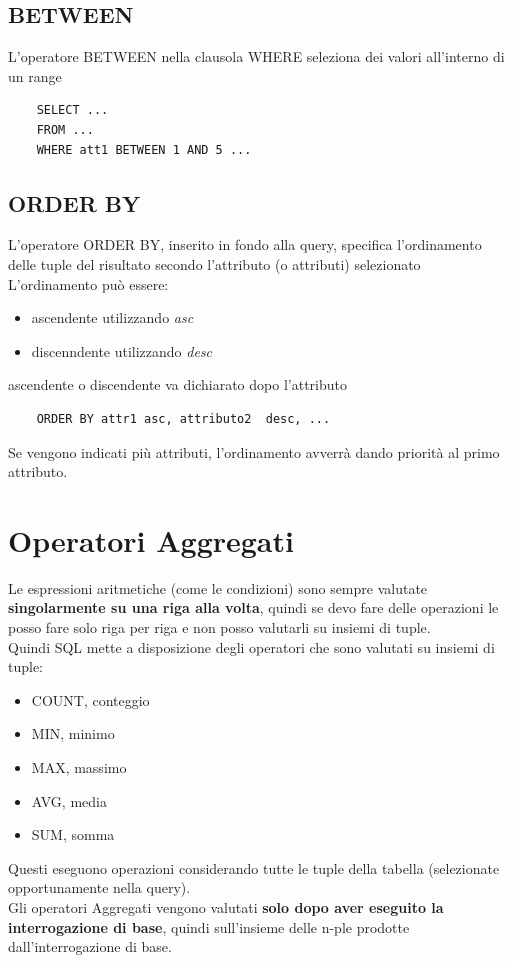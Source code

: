 \documentclass[12pt, a4paper, openany]{book}
\begin{document}
\subsection*{BETWEEN}
L'operatore BETWEEN nella clausola WHERE seleziona dei valori all'interno di un range
\begin{verbatim}
    SELECT ...
    FROM ...
    WHERE att1 BETWEEN 1 AND 5 ...
\end{verbatim}

\subsection*{ORDER BY}
L'operatore ORDER BY, inserito in fondo alla query, specifica l'ordinamento delle tuple del risultato secondo l'attributo (o attributi) selezionato\\
L'ordinamento può essere:
\begin{itemize}
    \item ascendente utilizzando \emph{asc}
    \item discenndente utilizzando \emph{desc}
\end{itemize}
ascendente o discendente va dichiarato dopo l'attributo
\begin{verbatim}
    ORDER BY attr1 asc, attributo2  desc, ...
\end{verbatim}
Se vengono indicati più attributi, l'ordinamento avverrà dando priorità al primo attributo.


\section{Operatori Aggregati}
Le espressioni aritmetiche (come le condizioni) sono sempre valutate \textbf{singolarmente su una riga alla volta}, quindi se devo fare delle operazioni le posso fare solo riga per riga e non posso valutarli su insiemi di tuple.
\\Quindi SQL mette a disposizione degli operatori che sono valutati su insiemi di tuple:
\begin{itemize}
    \item COUNT, conteggio
    \item MIN, minimo
    \item MAX, massimo
    \item AVG, media
    \item SUM, somma
\end{itemize}
Questi eseguono operazioni considerando tutte le tuple della tabella (selezionate opportunamente nella query).
\\Gli operatori Aggregati vengono valutati \textbf{solo dopo aver eseguito la interrogazione di base}, quindi sull'insieme delle n-ple prodotte dall'interrogazione di base.
\end{document}
